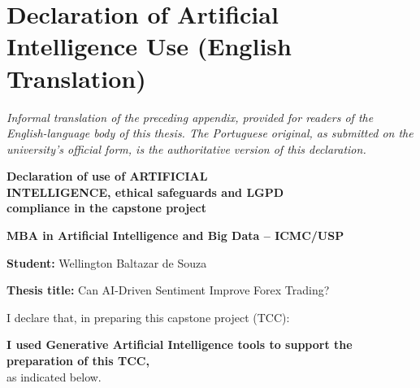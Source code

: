 \chapter{Declaration of Artificial Intelligence Use (English Translation)} \label{app:declaracao-ia-en}

\textit{Informal translation of the preceding appendix, provided for readers of the English-language body of this thesis. The Portuguese original, as submitted on the university's official form, is the authoritative version of this declaration.}

\begin{center}
{\bfseries\fontsize{15}{16}\selectfont
Declaration of use of ARTIFICIAL\\
INTELLIGENCE, ethical safeguards and LGPD\\
compliance in the capstone project\par}
\vspace{0.65cm}
{\bfseries\large MBA in Artificial Intelligence and Big Data -- ICMC/USP}
\end{center}

\vspace{0.25cm}
\textbf{Student:} Wellington Baltazar de Souza

\vspace{0.48cm}
\textbf{Thesis title:} Can AI-Driven Sentiment Improve Forex Trading?

\vspace{1.0cm}
I declare that, in preparing this capstone project (TCC):

\vspace{0.45cm}

\vspace{0.35cm}
\noindent\checkedbox\hspace{0.12cm}\textbf{I used Generative Artificial Intelligence tools to support the preparation of this TCC,}\\
\hspace*{0.35cm}as indicated below.


